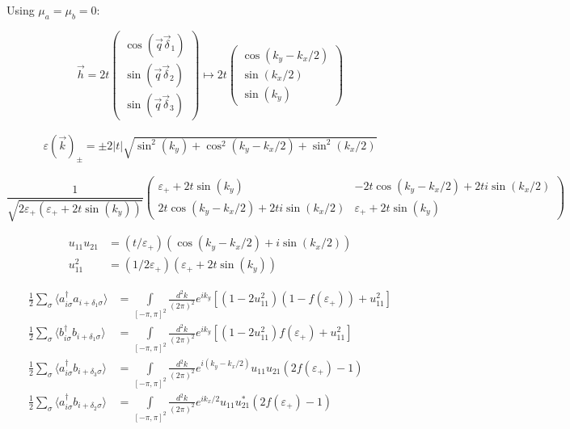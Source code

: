 \documentclass[../../../main.tex]{subfiles}
\begin{document}
Using $\mu_a = \mu_b = 0$:

\begin{equation}
	\vec{h} = 2t
	\begin{pmatrix}
		\cos(\vec{q}\vec{\delta}_1) \\
		\sin(\vec{q}\vec{\delta}_2) \\
		\sin(\vec{q}\vec{\delta}_3)
	\end{pmatrix} \mapsto 2t
	\begin{pmatrix}
		\cos(k_y-k_x/2) \\
		\sin(k_x/2) \\
		\sin(k_y) 
	\end{pmatrix}
\end{equation}

\begin{gather}
	\varepsilon(\vec{k})_{\pm} = \pm 2|t|\sqrt{\sin^2(k_y) +\cos^2(k_y-k_x/2) + \sin^2(k_x/2)}
\end{gather}

\begin{equation}
\frac{1}{\sqrt{2\varepsilon_{+}(\varepsilon_+ + 2t\sin(k_y))}}
\begin{pmatrix}
\varepsilon_+ + 2t\sin(k_y) &-2t\cos(k_y - k_x/2) + 2ti\sin(k_x/2) \\
2t\cos(k_y-k_x/2) + 2ti\sin(k_x/2) &\varepsilon_+ + 2t\sin(k_y) 
\end{pmatrix}
\end{equation}


\begin{align}
	u_{11}u_{21} &= (t/\varepsilon_+)(\cos(k_y-k_x/2) + i \sin(k_x/2)) \\
	u_{11}^2 &= (1/2\varepsilon_+)(\varepsilon_+ + 2t\sin(k_y))
\end{align}


\begin{align}
	\frac12	\sum_\sigma\langle a_{i\sigma}^\dagger a_{i+\delta_1\sigma } \rangle &= \int\limits_{[-\pi,\pi]^2}  \frac{d^2k}{(2\pi)^2} e^{i k_y} \left[(1-2u_{11}^2)(1-f(\varepsilon_+)) + u_{11}^2\right] \\
	\frac12 \sum_\sigma \langle b_{i\sigma}^\dagger b_{i+\delta_1\sigma} \rangle &= \int\limits_{[-\pi,\pi]^2} \frac{d^2k}{(2\pi)^2} e^{i k_y} \left[(1-2u_{11}^2)f(\varepsilon_+) + u_{11}^2\right] \\
	\frac12 \sum_\sigma \langle a_{i\sigma}^\dagger b_{i+\delta_3\sigma} \rangle &= \int\limits_{[-\pi,\pi]^2} \frac{d^2k}{(2\pi)^2} e^{i(k_y-k_x/2)}u_{11}u_{21}(2f(\varepsilon_+) -1) \\
	\frac12 \sum_\sigma \langle a_{i\sigma}^\dagger b_{i+\delta_2\sigma} \rangle &= \int\limits_{[-\pi, \pi]^2} \frac{d^2k}{(2\pi)^2} e^{ik_x/2} u_{11}u_{21}^*(2f(\varepsilon_+)-1)
\end{align}
\end{document}
